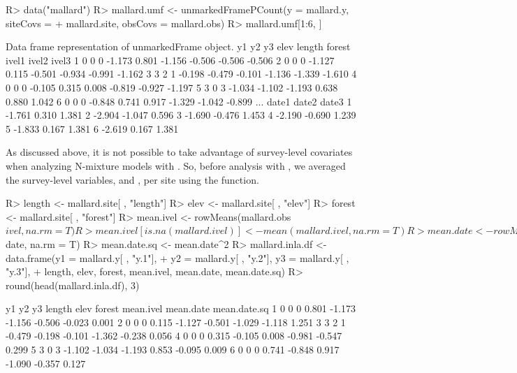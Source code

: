 \documentclass[codesnippet]{jss}
\begin{document}
\begin{CodeInput}
R> data("mallard")
R> mallard.umf <- unmarkedFramePCount(y = mallard.y, siteCovs = 
+    mallard.site, obsCovs = mallard.obs)
R> mallard.umf[1:6, ]
\end{CodeInput}
\begin{CodeOutput}
Data frame representation of unmarkedFrame object.
   y1   y2   y3    elev length forest  ivel1  ivel2  ivel3  
1   0    0    0  -1.173  0.801 -1.156 -0.506 -0.506 -0.506 
2   0    0    0  -1.127  0.115 -0.501 -0.934 -0.991 -1.162 
3   3    2    1  -0.198 -0.479 -0.101 -1.136 -1.339 -1.610 
4   0    0    0  -0.105  0.315  0.008 -0.819 -0.927 -1.197 
5   3    0    3  -1.034 -1.102 -1.193  0.638  0.880  1.042 
6   0    0    0  -0.848  0.741  0.917 -1.329 -1.042 -0.899 
...
    date1  date2  date3
1  -1.761  0.310  1.381
2  -2.904 -1.047  0.596
3  -1.690 -0.476  1.453
4  -2.190 -0.690  1.239
5  -1.833  0.167  1.381
6  -2.619  0.167  1.381
\end{CodeOutput}

As discussed above, it is not possible to take advantage of survey-level covariates when analyzing N-mixture models with .  So, before analysis with , we averaged the survey-level variables,  and , per site using the  function.

\begin{CodeInput}
R> length <- mallard.site[ , "length"]
R> elev <- mallard.site[ , "elev"]
R> forest <- mallard.site[ , "forest"]
R> mean.ivel <- rowMeans(mallard.obs$ivel, na.rm = T) 
R> mean.ivel[is.na(mallard.ivel)] <- mean(mallard.ivel, na.rm = T)
R> mean.date <- rowMeans(mallard.obs$date, na.rm = T) 
R> mean.date.sq <- mean.date^2
R> mallard.inla.df <- data.frame(y1 = mallard.y[ , "y.1"], 
+    y2 = mallard.y[ , "y.2"], y3 = mallard.y[ , "y.3"], 
+    length, elev, forest, mean.ivel, mean.date, mean.date.sq)
R> round(head(mallard.inla.df), 3)
\end{CodeInput}
\begin{CodeOutput}
  y1 y2 y3 length   elev forest mean.ivel mean.date mean.date.sq
1  0  0  0  0.801 -1.173 -1.156    -0.506    -0.023        0.001
2  0  0  0  0.115 -1.127 -0.501    -1.029    -1.118        1.251
3  3  2  1 -0.479 -0.198 -0.101    -1.362    -0.238        0.056
4  0  0  0  0.315 -0.105  0.008    -0.981    -0.547        0.299
5  3  0  3 -1.102 -1.034 -1.193     0.853    -0.095        0.009
6  0  0  0  0.741 -0.848  0.917    -1.090    -0.357        0.127
\end{CodeOutput}
\end{document}
